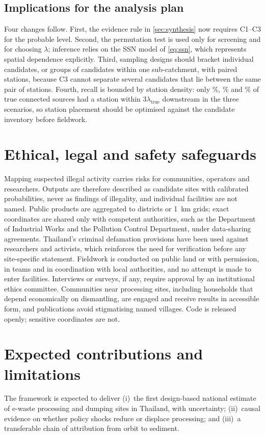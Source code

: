 \documentclass[10pt]{article}
\begin{document}


\subsection{Implications for the analysis plan}
Four changes follow. First, the evidence rule in \cref{sec:synthesis} now requires C1--C3 for the probable level. Second, the permutation test is used only for screening and for choosing $\lambda$; inference relies on the SSN model of \cref{eq:ssn}, which represents spatial dependence explicitly. Third, sampling designs should bracket individual candidates, or groups of candidates within one sub-catchment, with paired stations, because C3 cannot separate several candidates that lie between the same pair of stations. Fourth, recall is bounded by station density: only \attribShareThree\%, \attribShareEight\% and \attribShareTwenty\% of true connected sources had a station within $3\lambda_{\mathrm{true}}$ downstream in the three scenarios, so station placement should be optimised against the candidate inventory before fieldwork.

\section{Ethical, legal and safety safeguards}\label{sec:ethics}
Mapping suspected illegal activity carries risks for communities, operators and researchers. Outputs are therefore described as candidate sites with calibrated probabilities, never as findings of illegality, and individual facilities are not named. Public products are aggregated to districts or 1~km grids; exact coordinates are shared only with competent authorities, such as the Department of Industrial Works and the Pollution Control Department, under data-sharing agreements. Thailand's criminal defamation provisions have been used against researchers and activists, which reinforces the need for verification before any site-specific statement. Fieldwork is conducted on public land or with permission, in teams and in coordination with local authorities, and no attempt is made to enter facilities. Interviews or surveys, if any, require approval by an institutional ethics committee. Communities near processing sites, including households that depend economically on dismantling, are engaged and receive results in accessible form, and publications avoid stigmatising named villages. Code is released openly; sensitive coordinates are not.

\section{Expected contributions and limitations}\label{sec:discussion}
The framework is expected to deliver (i)~the first design-based national estimate of e-waste processing and dumping sites in Thailand, with uncertainty; (ii)~causal evidence on whether policy shocks reduce or displace processing; and (iii)~a transferable chain of attribution from orbit to sediment.
\end{document}
